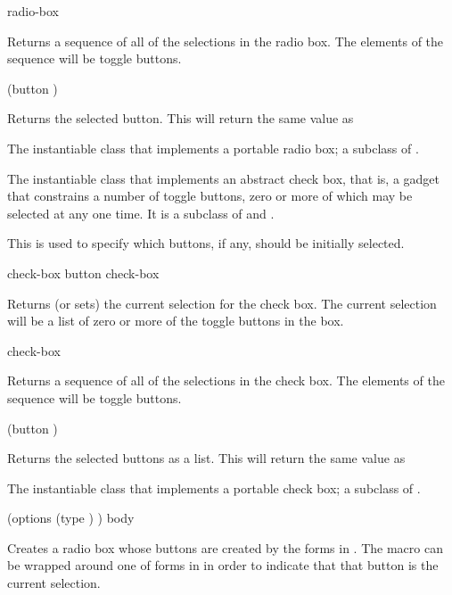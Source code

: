  {radio-box}

Returns a sequence of all of the selections in the radio box.  The elements of
the sequence will be toggle buttons.

 {(button )}

Returns the selected button.  This will return the same value as


The instantiable class that implements a portable radio box; a subclass of
.



The instantiable class that implements an abstract check box, that is, a gadget
that constrains a number of toggle buttons, zero or more of which may be
selected at any one time.  It is a subclass of  and
.


This is used to specify which buttons, if any, should be initially selected.

 {check-box}
 {button check-box}

Returns (or sets) the current selection for the check box.  The current
selection will be a list of zero or more of the toggle buttons in the box.

 {check-box}

Returns a sequence of all of the selections in the check box.  The elements of
the sequence will be toggle buttons.

 {(button )}

Returns the selected buttons as a list.  This will return the same value as


The instantiable class that implements a portable check box; a subclass of
.


 {(\rest options \key (type ) \allow) \body body}

Creates a radio box whose buttons are created by the forms in .  The
macro  can be wrapped around one of forms in
 in order to indicate that that button is the current selection.

